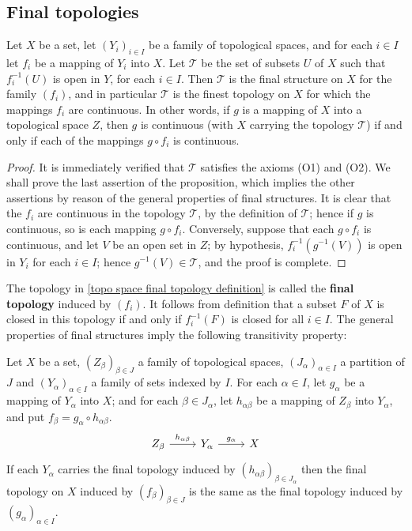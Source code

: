 \subsection{Final topologies}
\begin{proposition}\label{topo space final topology definition}
Let $X$ be a set, let $(Y_i)_{i\in I}$ be a family of topological spaces, and for each $i\in I$ let $f_i$ be a mapping of $Y_i$ into $X$. Let $\mathcal{T}$ be the set of subsets $U$ of $X$ such that $f_i^{-1}(U)$ is open in $Y$, for each $i\in I$. Then $\mathcal{T}$ is the final structure on $X$ for the family $(f_i)$, and in particular $\mathcal{T}$ is the finest topology on $X$ for which the mappings $f_i$ are continuous. In other words, if $g$ is a mapping of $X$ into a topological space $Z$, then $g$ is continuous (with $X$ carrying the topology $\mathcal{T}$) if and only if each of the mappings $g\circ f_i$ is continuous.
\end{proposition}
\begin{proof}
It is immediately verified that $\mathcal{T}$ satisfies the axioms (O1) and (O2). We shall prove the last assertion of the proposition, which implies the other assertions by reason of the general properties of final structures. It is clear that the $f_i$ are continuous in the topology $\mathcal{T}$, by the definition of $\mathcal{T}$; hence if $g$ is continuous, so is each mapping $g\circ f_i$. Conversely, suppose that each $g\circ f_i$ is continuous, and let $V$ be an open set in $Z$; by hypothesis, $f_i^{-1}(g^{-1}(V))$ is open in $Y_i$ for each $i\in I$; hence $g^{-1}(V)\in\mathcal{T}$, and the proof is complete.
\end{proof}
The topology in \cref{topo space final topology definition} is called the \textbf{final topology} induced by $(f_i)$. It follows from definition that a subset $F$ of $X$ is closed in this topology if and only if $f_i^{-1}(F)$ is closed for all $i\in I$. The general properties of final structures imply the following transitivity property:
\begin{proposition}
Let $X$ be a set, $(Z_\beta)_{\beta\in J}$ a family of topological spaces, $(J_\alpha)_{\alpha\in I}$ a partition of $J$ and $(Y_\alpha)_{\alpha\in I}$ a family of sets indexed by $I$. For each $\alpha\in I$, let $g_\alpha$ be a mapping of $Y_\alpha$ into $X$; and for each $\beta\in J_\alpha$, let $h_{\alpha\beta}$ be a mapping of $Z_\beta$ into $Y_\alpha$, and put $f_\beta=g_\alpha\circ h_{\alpha\beta}$. 
\[\begin{tikzcd}
Z_\beta\ar[r,"h_{\alpha\beta}"]&Y_\alpha\ar[r,"g_\alpha"]&X
\end{tikzcd}\]
If each $Y_\alpha$ carries the final topology induced by $(h_{\alpha\beta})_{\beta\in J_\alpha}$ then the final topology on $X$ induced by $(f_\beta)_{\beta\in J}$ is the same as the final topology induced by $(g_\alpha)_{\alpha\in I}$.
\end{proposition}
